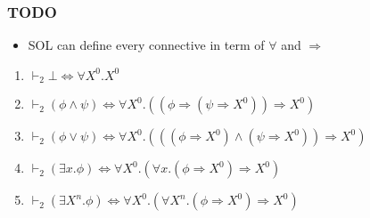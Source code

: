 \documentclass{beamer}
\begin{document}
                \begin{frame}
                    \frametitle{TODO}
                    \begin{itemize}
                        \item SOL can define every connective in term of $ \forall $ and $ \Rightarrow $
                    \end{itemize}
                    \begin{theorem}
                        \begin{enumerate}
                            \item $ \vdash_2 \bot \Leftrightarrow \forall X^0. X^0 $
                            \item $ \vdash_2 (\phi \wedge \psi) \Leftrightarrow \forall X^0. ((\phi \Rightarrow (\psi \Rightarrow X^0)) \Rightarrow X^0) $
                            \item $ \vdash_2 (\phi \vee \psi) \Leftrightarrow \forall X^0. (((\phi \Rightarrow X^0) \wedge (\psi \Rightarrow X^0)) \Rightarrow X^0) $
                            \item $ \vdash_2 (\exists x.\phi) \Leftrightarrow \forall X^0. (\forall x. (\phi \Rightarrow X^0) \Rightarrow X^0) $
                            \item $ \vdash_2 (\exists X^n.\phi) \Leftrightarrow \forall X^0. (\forall X^n. (\phi \Rightarrow X^0) \Rightarrow X^0) $
                        \end{enumerate}
                    \end{theorem}

                \end{frame}
\end{document}
